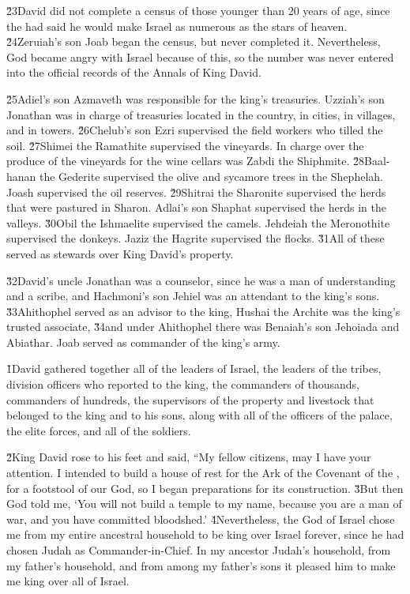 \v{23}David did not complete a census of those younger than 20 years of age, since the  had said he would make Israel as numerous as the stars of heaven. \v{24}Zeruiah's son Joab began the census, but never completed it. Nevertheless, God became angry with Israel because of this, so the number was never entered into the official records of the Annals of King David.

\v{25}Adiel's son Azmaveth was responsible for the king's treasuries. Uzziah's son Jonathan was in charge of treasuries located in the country, in cities, in villages, and in towers. \v{26}Chelub's son Ezri supervised the field workers who tilled the soil. \v{27}Shimei the Ramathite supervised the vineyards. In charge over the produce of the vineyards for the wine cellars was Zabdi the Shiphmite. \v{28}Baal-hanan the Gederite supervised the olive and sycamore trees in the Shephelah. Joash supervised the oil reserves. \v{29}Shitrai the Sharonite supervised the herds that were pastured in Sharon. Adlai's son Shaphat supervised the herds in the valleys. \v{30}Obil the Ishmaelite supervised the camels. Jehdeiah the Meronothite supervised the donkeys. Jaziz the Hagrite supervised the flocks. \v{31}All of these served as stewards over King David's property.

\v{32}David's uncle Jonathan was a counselor, since he was a man of understanding and a scribe, and Hachmoni's son Jehiel was an attendant to the king's sons. \v{33}Ahithophel served as an advisor to the king, Hushai the Archite was the king's trusted associate, \v{34}and under Ahithophel there was Benaiah's son Jehoiada and Abiathar. Joab served as commander of the king's army.

\v{1}David gathered together all of the leaders of Israel, the leaders of the tribes, division officers who reported to the king, the commanders of thousands, commanders of hundreds, the supervisors of the property and livestock that belonged to the king and to his sons, along with all of the officers of the palace, the elite forces, and all of the soldiers.

\v{2}King David rose to his feet and said, ``My fellow citizens, may I have your attention. I intended to build a house of rest for the Ark of the Covenant of the , for a footstool of our God, so I began preparations for its construction. \v{3}But then God told me, `You will not build a temple to my name, because you are a man of war, and you have committed bloodshed.' \v{4}Nevertheless, the  God of Israel chose me from my entire ancestral household to be king over Israel forever, since he had chosen Judah as Commander-in-Chief. In my ancestor Judah's household, from my father's household, and from among my father's sons it pleased him to make me king over all of Israel.

